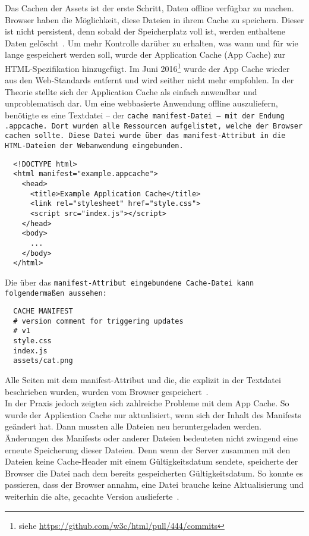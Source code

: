 Das Cachen der \gls{Assets} ist der erste Schritt, Daten offline verfügbar zu machen. Browser haben die Möglichkeit, diese Dateien in ihrem Cache zu speichern.
Dieser ist nicht persistent, denn sobald der Speicherplatz voll ist, werden enthaltene Daten gelöscht~\cite{cache}.
%
%
Um mehr Kontrolle darüber zu erhalten, was wann und für wie lange gespeichert werden soll, wurde der Application Cache (App Cache) zur \gls{HTML}-Spezifikation hinzugefügt.
Im Juni 2016\footnote{siehe \url{https://github.com/w3c/html/pull/444/commits}} wurde der App Cache wieder aus den Web-Standards entfernt und wird seither nicht mehr empfohlen.
In der Theorie stellte sich der Application Cache als einfach anwendbar und unproblematisch dar. Um eine webbasierte Anwendung offline auszuliefern, benötigte es eine Textdatei -- der \tt{cache manifest}-Datei -- mit der Endung \tt{.appcache}. Dort wurden alle Ressourcen aufgelistet, welche der Browser cachen sollte.
Diese Datei wurde über das \tt{manifest}-Attribut in die \gls{HTML}-Dateien der Webanwendung eingebunden.
%
\begin{lstlisting}
  <!DOCTYPE html>
  <html manifest="example.appcache">
    <head>
      <title>Example Application Cache</title>
      <link rel="stylesheet" href="style.css">
      <script src="index.js"></script>
    </head>
    <body>
      ...
    </body>
  </html>
\end{lstlisting}
%
Die über das \tt{manifest}-Attribut eingebundene Cache-Datei kann folgendermaßen aussehen:
\begin{lstlisting}
  CACHE MANIFEST
  # version comment for triggering updates
  # v1
  style.css
  index.js
  assets/cat.png
\end{lstlisting}
Alle Seiten mit dem manifest-Attribut und die, die explizit in der Textdatei beschrieben wurden, wurden vom Browser gespeichert~\cite{appcache}.\\
In der Praxis jedoch zeigten sich zahlreiche Probleme mit dem App Cache. So wurde der Application Cache nur aktualisiert, wenn sich der Inhalt des Manifests geändert hat. Dann mussten alle Dateien neu heruntergeladen werden.
Änderungen des Manifests oder anderer Dateien bedeuteten nicht zwingend eine erneute Speicherung dieser Dateien.
Denn wenn der Server zusammen mit den Dateien keine Cache-Header mit einem Gültigkeitsdatum sendete, speicherte der Browser die Datei nach dem bereits gespeicherten Gültigkeitsdatum. So konnte es passieren, dass der Browser annahm, eine Datei brauche keine Aktualisierung und weiterhin die alte, gecachte Version auslieferte~\cite{noappcache}.\\
